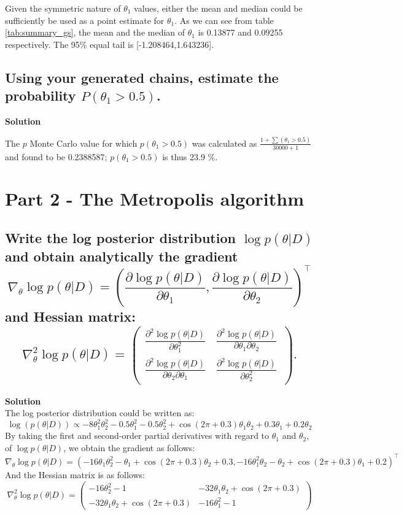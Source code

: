\documentclass[12pt]{article}
\begin{document}
Given the symmetric nature of $\theta_1$ values, either the mean and median could be sufficiently be used as a point estimate for $\theta_1$. As we can see from table \ref{tab:summary_gs}, the mean and the median of $\theta_1$ is 0.13877 and 0.09255 respectively. The 95\% equal tail is [-1.208464,1.643236].


\subsection{Using your generated chains, estimate the probability $P(\theta_1 > 0.5)$.}
\textbf{Solution}

The $p$ Monte Carlo value for which $p(\theta_1 > 0.5)$ was calculated as  $\frac{1 + \sum (\theta_1 > 0.5)}{30000 + 1}$ and found to be 0.2388587; $p(\theta_1 > 0.5)$ is thus 23.9 \%.


\section{Part 2 - The Metropolis algorithm}
\subsection{Write the log posterior distribution \( \log p(\theta|D) \) and obtain analytically the gradient
\[\nabla_\theta \log p(\theta|D) = \left( \frac{\partial \log p(\theta|D)}{\partial \theta_1}, \frac{\partial \log p(\theta|D)}{\partial \theta_2} \right)^\top \]
and Hessian matrix:
\[\nabla^2_\theta \log p(\theta|D) = 
\begin{pmatrix}
\frac{\partial^2 \log p(\theta|D)}{\partial \theta_1^2} & \frac{\partial^2 \log p(\theta|D)}{\partial \theta_1 \partial \theta_2} \\
\frac{\partial^2 \log p(\theta|D)}{\partial \theta_2 \partial \theta_1} & \frac{\partial^2 \log p(\theta|D)}{\partial \theta_2^2} 
\end{pmatrix}.\]}
\textbf{Solution}\\
The log posterior distribution could be written as:
\[
\log(p(\theta|D)) \propto -8\theta_1^2\theta_2^2 - 0.5\theta_1^2 - 0.5\theta_2^2 + \cos(2\pi + 0.3)\theta_1\theta_2 + 0.3\theta_1 + 0.2\theta_2
\]
By taking the first and second-order partial derivatives with regard to \(\theta_1\) and \(\theta_2\), of \(\log p(\theta|D)\),
we obtain the gradient as follows:
\[
\nabla_\theta \log p(\theta|D) = \left( -16\theta_1\theta_2^2 - \theta_1 + \cos(2\pi + 0.3)\theta_2 + 0.3, -16\theta_1^2\theta_2 - \theta_2 + \cos(2\pi + 0.3)\theta_1 + 0.2 \right)^\top
\]
And the Hessian matrix is as follows:
\[
\nabla^2_\theta \log p(\theta|D) = 
\begin{pmatrix}
-16\theta_2^2 - 1 & -32\theta_1\theta_2 + \cos(2\pi + 0.3) \\
-32\theta_1\theta_2 + \cos(2\pi + 0.3) & -16\theta_1^2 - 1
\end{pmatrix}
\]
\end{document}
